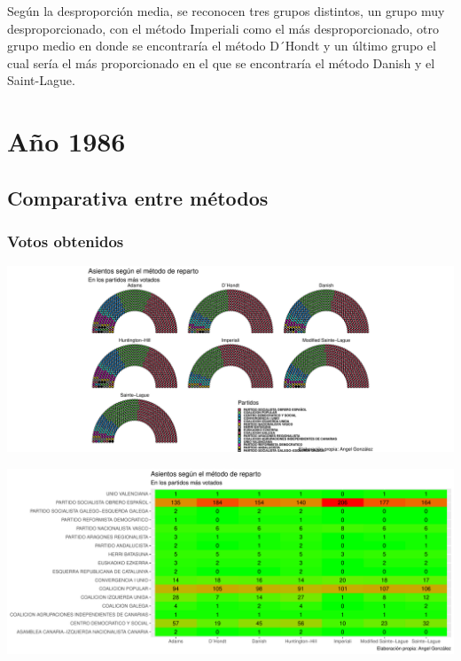\documentclass[12pt,a4paper,]{book}
\numberwithin{dummy}{section}
\theoremstyle{ocrenumbox}
\theoremstyle{blacknumex}
\theoremstyle{blacknumbox}
\theoremstyle{ocrenum}
\theoremstyle{ocrenum}
\begin{document}
Según la desproporción media, se reconocen tres grupos distintos, un
grupo muy desproporcionado, con el método Imperiali como el más
desproporcionado, otro grupo medio en donde se encontraría el método
D´Hondt y un último grupo el cual sería el más proporcionado en el que
se encontraría el método Danish y el Saint-Lague.

\hypertarget{auxf1o-1986}{%
\section{Año 1986}\label{auxf1o-1986}}

\hypertarget{comparativa-entre-muxe9todos-3}{%
\subsection{Comparativa entre
métodos}\label{comparativa-entre-muxe9todos-3}}

\hypertarget{votos-obtenidos-3}{%
\subsubsection{Votos obtenidos}\label{votos-obtenidos-3}}

\begin{center}\includegraphics[width=0.95\linewidth]{figurasR/unnamed-chunk-89-1} \end{center}

\begin{center}\includegraphics[width=0.95\linewidth]{figurasR/unnamed-chunk-89-2} \end{center}
\end{document}
